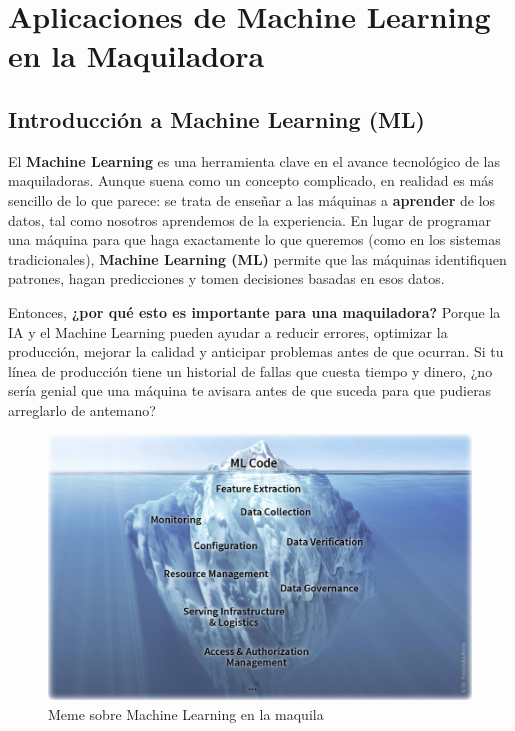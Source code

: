 \section{Aplicaciones de Machine Learning en la Maquiladora}\label{aplicaciones-de-machine-learning-en-la-maquiladora}

\subsection{\textbf{Introducción a Machine Learning (ML)}}\label{introduccion-a-machine-learning-ml}

El \textbf{Machine Learning} es una herramienta clave en el avance tecnológico de las maquiladoras. Aunque suena como un concepto complicado, en realidad es más sencillo de lo que parece: se trata de enseñar a las máquinas a \textbf{aprender} de los datos, tal como nosotros aprendemos de la experiencia. En lugar de programar una máquina para que haga exactamente lo que queremos (como en los sistemas tradicionales), \textbf{Machine Learning (ML)} permite que las máquinas identifiquen patrones, hagan predicciones y tomen decisiones basadas en esos datos.

Entonces, \textbf{¿por qué esto es importante para una maquiladora?} Porque la IA y el Machine Learning pueden ayudar a reducir errores, optimizar la producción, mejorar la calidad y anticipar problemas antes de que ocurran. Si tu línea de producción tiene un historial de fallas que cuesta tiempo y dinero, ¿no sería genial que una máquina te avisara antes de que suceda para que pudieras arreglarlo de antemano?

\begin{figure}[H]
\centering
\begin{adjustbox}{width=\textwidth}
\includegraphics{img/imagen_186.jpg}
\end{adjustbox}
\caption{Meme sobre Machine Learning en la maquila}
\end{figure}

